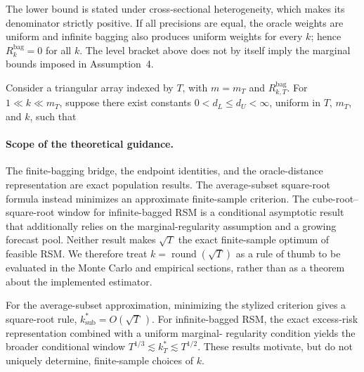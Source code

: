 The lower bound is stated under cross-sectional heterogeneity, which makes its
denominator strictly positive.  If all precisions are equal, the oracle weights
are uniform and infinite bagging also produces uniform weights for every $k$;
hence $R_k^{\mathrm{bag}}=0$ for all $k$.  The level bracket above does not by
itself imply the marginal bounds imposed in Assumption~4.

Consider a triangular array indexed by $T$, with $m=m_T$ and
$R_{k,T}^{\mathrm{bag}}$.  For $1\ll k\ll m_T$, suppose there exist constants
$0<d_L\le d_U<\infty$, uniform in $T$, $m_T$, and $k$, such that

\paragraph{Scope of the theoretical guidance.}
The finite-bagging bridge, the endpoint identities, and the oracle-distance
representation are exact population results.  The average-subset square-root
formula instead minimizes an approximate finite-sample criterion.  The
cube-root--square-root window for infinite-bagged RSM is a conditional
asymptotic result that additionally relies on the marginal-regularity
assumption and a growing forecast pool.  Neither result makes
$\sqrt{T}$ the exact finite-sample optimum of feasible RSM.  We therefore treat
$k=\operatorname{round}(\sqrt{T})$ as a rule of thumb to be evaluated in the
Monte Carlo and empirical sections, rather than as a theorem about the
implemented estimator.

For the average-subset approximation, minimizing the stylized criterion gives
a square-root rule, $k_{\mathrm{sub}}^*=O(\!\sqrt{T}\,)$.  For infinite-bagged
RSM, the exact excess-risk representation combined with a uniform marginal-
regularity condition yields the broader conditional window
$T^{1/3}\lesssim k_T^*\lesssim T^{1/2}$.  These results motivate, but do not
uniquely determine, finite-sample choices of $k$.

